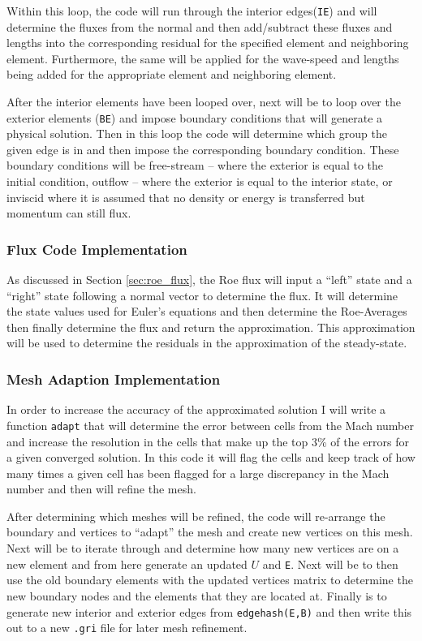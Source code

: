 Within this loop, the code will run through the interior edges({\texttt{IE}}) and will determine the fluxes from the normal and then add/subtract these fluxes and lengths into the corresponding residual for the specified element and neighboring element. Furthermore, the same will be applied for the wave-speed and lengths being added for the appropriate element and neighboring element.

After the interior elements have been looped over, next will be to loop over the exterior elements ({\texttt{BE}}) and impose boundary conditions that will generate a physical solution. Then in this loop the code will determine which group the given edge is in and then impose the corresponding boundary condition. These boundary conditions will be free-stream -- where the exterior is equal to the initial condition, outflow -- where the exterior is equal to the interior state, or inviscid where it is assumed that no density or energy is transferred but momentum can still flux.

\pagebreak
\subsubsection{Flux Code Implementation}
As discussed in Section \ref{sec:roe_flux}, the Roe flux will input a ``left'' state and a ``right'' state following a normal vector to determine the flux. It will determine the state values used for Euler's equations and then determine the Roe-Averages then finally determine the flux and return the approximation. This approximation will be used to determine the residuals in the approximation of the steady-state.


\subsubsection{Mesh Adaption Implementation}
In order to increase the accuracy of the approximated solution I will write a function {\texttt{adapt}} that will determine the error between cells from the Mach number and increase the resolution in the cells that make up the top 3\% of the errors for a given converged solution. In this code it will flag the cells and keep track of how many times a given cell has been flagged for a large discrepancy in the Mach number and then will refine the mesh.

After determining which meshes will be refined, the code will re-arrange the boundary and vertices to ``adapt'' the mesh and create new vertices on this mesh. Next will be to iterate through and determine how many new vertices are on a new element and from here generate an updated $U$ and {\texttt{E}}. Next will be to then use the old boundary elements with the updated vertices matrix to determine the new boundary nodes and the elements that they are located at. Finally is to generate new interior and exterior edges from {\texttt{edgehash(E,B)}} and then write this out to a new {\texttt{.gri}} file for later mesh refinement.

